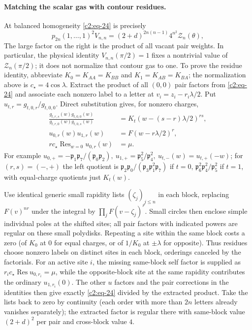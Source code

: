 \paragraph{Matching the scalar gas with contour residues.}
At balanced homogeneity \eqref{c2:eq-24} is precisely
\[
 p_{2n}(1,\ldots,1)^2 V_{n,n}=(2+d)^{2n(n-1)}4^{n^2}\mathcal Z_n(\theta),
\]
The large factor on the right is the product of all vacant pair
weights. In particular, the physical identity
\(V_{n,n}(\pi/2)=1\) fixes a nontrivial value of
\(\mathcal Z_n(\pi/2)\); it does not normalize that contour gas to one.
To prove the residue identity, abbreviate \(K_0=K_{AA}=K_{BB}\) and \(K_1=K_{AB}=K_{BA}\); the normalization above is \(c_\star=4\cos\lambda\). Extract the product of all \((0,0)\) pair factors from \eqref{c2:eq-24} and associate each nonzero label to a letter at \(v_i=z_i-r_i\lambda/2\). Put \(u_{t,r}=g_{t,0,r}/g_{t,0,0}\). Direct substitution gives, for nonzero charges,
\[
\begin{aligned}
 \frac{g_{t,r,s}(w)g_{t,0,0}(w)}{g_{t,r,0}(w)g_{t,0,s}(w)}
 &=K_t(w-(s-r)\lambda/2)^{rs},\\
 u_{0,r}(w)u_{1,r}(w)&=F(w-r\lambda/2)^r,\\
 r c_\star\operatorname{Res}_{w=0}u_{0,r}(w)&=\mu .
\end{aligned}
\]
For example \(u_{0,+}=-\mathfrak p_1\mathfrak p_7/(\mathfrak p_0\mathfrak p_2),\ u_{1,+}=\mathfrak p_5^2/\mathfrak p_4^2,\ u_{t,-}(w)=u_{t,+}(-w)\); for \((r,s)=(-,+)\) the left quotient is \(\mathfrak p_2\mathfrak p_0/(\mathfrak p_3\mathfrak p_1^2\mathfrak p_7)\) if \(t=0\), \(\mathfrak p_6^2\mathfrak p_4^2/\mathfrak p_5^2\) if \(t=1\), with equal-charge quotients just \(K_t(w)\).

Use identical generic small rapidity lists \((\zeta_j)_{j\le n}\) in each block, replacing \(F(v)^{nr}\) under the integral by \(\prod_j F(v-\zeta_j)^r\). Small circles then enclose simple individual poles at the shifted sites; all pair factors with indicated powers are regular on these small polydisks. Repeating a site within the same block costs a zero (of \(K_0\) at 0 for equal charges, or of \(1/K_0\) at \(\pm\lambda\) for opposite). Thus residues choose nonzero labels on distinct sites in each block, orderings canceled by the factorials. For an active site \(i\), the missing same-block self factor is supplied as \(r_i c_\star\operatorname{Res}u_{0,r_i}=\mu\), while the opposite-block site at the same rapidity contributes the ordinary \(u_{1,r_i}(0)\). The other \(u\) factors and the pair corrections in the identities then give exactly \eqref{c2:eq-24} divided by the extracted product. Take the lists back to zero by continuity (each order with more than \(2n\) letters already vanishes separately); the extracted factor is regular there with same-block value \((2+d)^2\) per pair and cross-block value \(4\).



